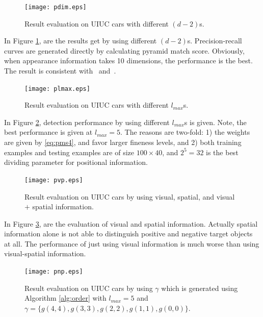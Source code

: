 \begin{figure}[!htbp]
\centering

\texttt{[image: pdim.eps]}


\caption[Result evaluation using different dimensions]{Result evaluation on UIUC cars with different $(d-2)$s.}
\label{fig:c52}
\end{figure}
\FloatBarrier

In Figure \ref{fig:c52}, are the results get by using different $(d-2)$s. Precision-recall curves are generated directly by calculating pyramid match score. Obviously, when appearance information takes 10 dimensions, the performance is the best. The result is consistent with~\citep{pmk} and~\citep{lwz}.


\begin{figure}[!htbp]
\centering

\texttt{[image: plmax.eps]}


\caption[Result evaluation using different largest fineness levels]{Result evaluation on UIUC cars with different $l_{max}$s.}
\label{fig:c53}
\end{figure}
\FloatBarrier

In Figure \ref{fig:c53}, detection performance by using different $l_{max}$s is given. Note, the best performance is given at $l_{max}=5$. The reasons are two-fold: 1) the weights are given by \ref{eq:pms4}, and favor larger fineness levels, and 2) both training examples and testing examples are of size $100 \times 40$, and $2^5=32$ is the best dividing parameter for positional information.

\begin{figure}[!htbp]
\centering

\texttt{[image: pvp.eps]}


\caption[Result evaluation by using results from only visual or spatial information]{Result evaluation on UIUC cars by using visual, spatial, and visual $+$ spatial information.}
\label{fig:c54}
\end{figure}
\FloatBarrier

In Figure \ref{fig:c54}, are the evaluation of visual and spatial information. Actually spatial information alone is not able to distinguish positive and negative target objects at all. The performance of just using visual information is much worse than using visual-spatial information.

\begin{figure}[!htbp]
\centering

\texttt{[image: pnp.eps]}


\caption[Result comparison with method using dividing methods of \citep{pmk}]{Result evaluation on UIUC cars by using $\gamma$ which is generated using Algorithm \ref{alg:order} with $l_{max}=5$ and $\gamma=\{g(4,4),g(3,3),g(2,2),g(1,1),g(0,0)\}$.}
\label{fig:c55}
\end{figure}
\FloatBarrier

